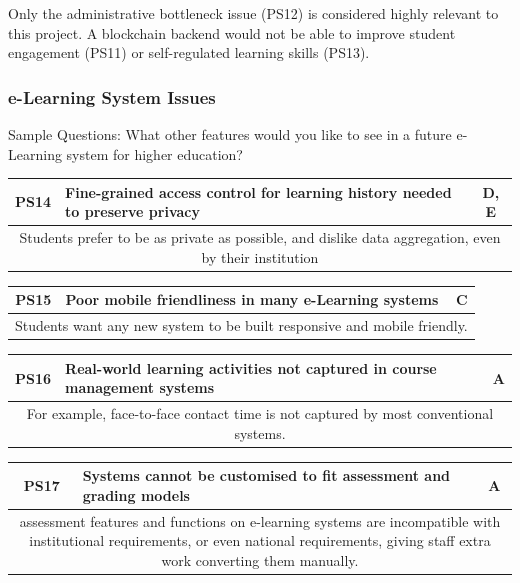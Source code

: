 Only the administrative bottleneck issue (PS12) is considered highly relevant to this project. 
A blockchain backend would not be able to improve student engagement (PS11) or self-regulated learning skills (PS13).

\subsubsection{e-Learning System Issues}

Sample Questions: What other features would you like to see in a future e-Learning system for
higher education?

\begin{table}[!ht]
	\begin{tabularx}{\textwidth}{|c|X|c|}
		\hline
		PS14 & \textbf{Fine-grained access control for learning history needed to preserve privacy} & D, E \\
		\hline
		\multicolumn{3}{|X|}{Students prefer to be as private as possible, and dislike data aggregation, 
		even by their institution}  \\
		\hline
	\end{tabularx}
\end{table}
\begin{table}[!ht]
	\begin{tabularx}{\textwidth}{|c|X|c|}
		\hline
		PS15 & \textbf{Poor mobile friendliness in many e-Learning systems} & C                        \\
		\hline
		\multicolumn{3}{|X|}{Students want any new system to be built responsive and mobile friendly.} \\
		\hline
	\end{tabularx}
\end{table}
\begin{table}[!ht]
	\begin{tabularx}{\textwidth}{|c|X|c|}
		\hline
		PS16 & \textbf{Real-world learning activities not captured in course management systems} & A               \\
		\hline
		\multicolumn{3}{|X|}{For example, face-to-face contact time is not captured by most conventional systems.} \\
		\hline
	\end{tabularx}
\end{table}
\begin{table}[!ht]
	\begin{tabularx}{\textwidth}{|c|X|c|}
		\hline
		PS17 & \textbf{Systems cannot be customised to fit assessment and grading models} & A                              \\
		\hline
		\multicolumn{3}{|X|}{assessment features and functions on e-learning systems are incompatible
			with institutional requirements, or even national requirements, giving staff extra work converting them manually.} \\
		\hline
	\end{tabularx}
\end{table}
